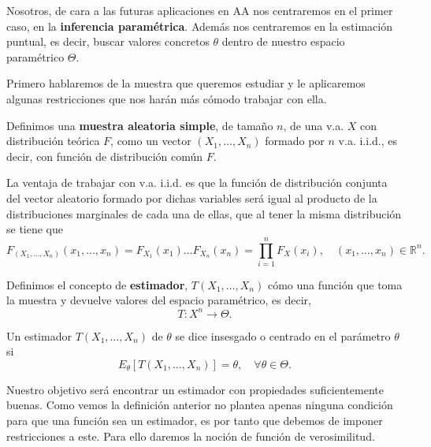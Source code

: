 Nosotros, de cara a las futuras aplicaciones en \ac{AA} nos centraremos en el primer caso, en la \textbf{inferencia paramétrica}. Además nos centraremos en la estimación puntual, es decir, buscar valores concretos $\theta$ dentro de nuestro espacio paramétrico $\Theta$.

Primero hablaremos de la muestra que queremos estudiar y le aplicaremos algunas restricciones que nos harán más cómodo trabajar con ella.

\begin{definition}
    Definimos una \textbf{muestra aleatoria simple}, de tamaño $n$, de una \ac{v.a.} $X$ con distribución teórica $F$, como un vector $(X_1, \ldots, X_n)$ formado por $n$ \ac{v.a.} \ac{i.i.d.}, es decir, con función de distribución común $F$.
\end{definition}

La ventaja de trabajar con \ac{v.a.} \ac{i.i.d.} es que la función de distribución conjunta del vector aleatorio formado por dichas variables será igual al producto de la distribuciones marginales de cada una de ellas, que al tener la misma distribución se tiene que
\begin{equation}
    F_{(X_1, \ldots, X_n)}(x_1, \ldots, x_n) = F_{X_1}(x_1)\ldots F_{X_n}(x_n) = \prod_{i=1}^n F_X(x_i), \quad (x_1, \ldots, x_n) \in \mathbb{R}^n.
\end{equation}

\begin{definition}
    Definimos el concepto de \textbf{estimador}, $T(X_1, \ldots, X_n)$ cómo una función que toma la muestra y devuelve valores del espacio paramétrico, es decir,
    \begin{equation}
        T: X^n \to \Theta.
    \end{equation}
\end{definition}

\begin{definition}
    Un estimador $T(X_1, \ldots, X_n)$ de $\theta$ se dice insesgado o centrado en el parámetro $\theta$ si
    \begin{equation}
         E_\theta[T(X_1, \ldots, X_n)] = \theta , \quad \forall \theta \in \Theta.
    \end{equation}
\end{definition}

Nuestro objetivo será encontrar un estimador con propiedades suficientemente buenas. Como vemos la definición anterior no plantea apenas ninguna condición para que una función sea un estimador, es por tanto que debemos de imponer restricciones a este. Para ello daremos la noción de función de verosimilitud.

